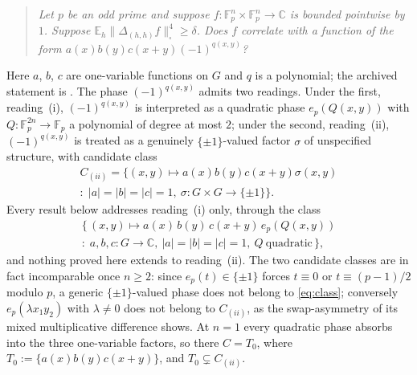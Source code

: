 \documentclass[11pt]{article}
\theoremstyle{remark}
\begin{document}
\begin{quote}\itshape
Let $p$ be an odd prime and suppose
$f:\mathbb{F}_p^n\times\mathbb{F}_p^n\to\mathbb{C}$ is bounded pointwise by
$1$. Suppose $\mathbb{E}_h\|\Delta_{(h,h)}f\|_\square^4\ge\delta$. Does $f$
correlate with a function of the form
$a(x)b(y)c(x+y)(-1)^{q(x,y)}$?
\end{quote}
\noindent
Here $a$, $b$, $c$ are one-variable functions on $G$ and $q$ is a polynomial;
the archived statement is \cite{unsolvedmath}. The phase $(-1)^{q(x,y)}$
admits two readings. Under the first, reading~(i), $(-1)^{q(x,y)}$ is
interpreted as a quadratic phase $e_p(Q(x,y))$ with
$Q:\mathbb{F}_p^{2n}\to\mathbb{F}_p$ a polynomial of degree at most $2$;
under the second, reading~(ii), $(-1)^{q(x,y)}$ is treated as a genuinely
$\{\pm1\}$-valued factor $\sigma$ of unspecified structure, with candidate
class
\begin{multline*}
C_{(ii)}=\bigl\{(x,y)\mapsto a(x)b(y)c(x+y)\sigma(x,y) \\
:\; |a|=|b|=|c|=1,\ \sigma:G\times G\to\{\pm1\}\bigr\}.
\end{multline*}
Every result below addresses reading~(i) only, through the class
\begin{multline}\label{eq:class}
\bigl\{\, (x,y)\mapsto a(x)\,b(y)\,c(x+y)\,e_p(Q(x,y)) \\
:\; a,b,c:G\to\mathbb{C},\ |a|=|b|=|c|=1,\ Q\ \text{quadratic} \,\bigr\},
\end{multline}
and nothing proved here extends to reading~(ii). The two candidate classes
are in fact incomparable once $n\ge2$: since $e_p(t)\in\{\pm1\}$ forces
$t\equiv0$ or $t\equiv(p-1)/2$ modulo $p$, a generic $\{\pm1\}$-valued phase
does not belong to \eqref{eq:class}; conversely $e_p(\lambda x_1y_2)$ with
$\lambda\neq0$ does not belong to $C_{(ii)}$, as the swap-asymmetry of its
mixed multiplicative difference shows. At $n=1$ every quadratic phase
absorbs into the three one-variable factors, so there $C=T_0$, where
$T_0:=\{a(x)b(y)c(x+y)\}$, and $T_0\subsetneq C_{(ii)}$.
\end{document}
